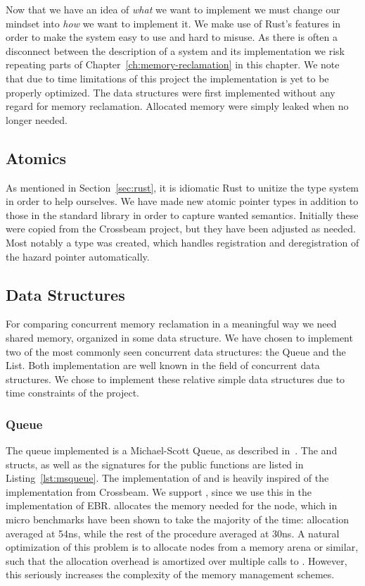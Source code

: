 \documentclass[b5paper]{report}
\begin{document}
Now that we have an idea of \emph{what} we want to implement we must change our
mindset into \emph{how} we want to implement it. We make use of Rust's features
in order to make the system easy to use and hard to misuse.  As there is often a
disconnect between the description of a system and its implementation we risk
repeating parts of Chapter~\ref{ch:memory-reclamation} in this chapter. We note
that due to time limitations of this project the implementation is yet to be
properly optimized. The data structures were first implemented without any
regard for memory reclamation.  Allocated memory were simply leaked when no
longer needed.


\subsection{Atomics\label{sec:atomics}}

As mentioned in Section~\ref{sec:rust}, it is idiomatic Rust to unitize the type
system in order to help ourselves. We have made new atomic pointer types in addition
to those in the standard library in order to capture wanted semantics. Initially
these were copied from the Crossbeam project\cite{crossbeam-msqueue}, but they have been adjusted as
needed. Most notably a  type was created, which handles
registration and deregistration of the hazard pointer automatically.


\subsection{Data Structures\label{sec:data-structures}}

For comparing concurrent memory reclamation in a meaningful way we need shared
memory, organized in some data structure. We have chosen to implement two of the
most commonly seen concurrent data structures: the Queue and the List. Both
implementation are well known in the field of concurrent data structures. We
chose to implement these relative simple data structures due to time constraints
of the project.


\subsubsection{Queue}

The queue implemented is a Michael-Scott Queue, as described
in~\cite{michael1996simple}. The  and  structs, as well
as the signatures for the public functions are listed in
Listing~\ref{lst:msqueue}. The implementation of  and  is
heavily inspired of the implementation from Crossbeam.  We support
, since we use this in the implementation of EBR.  
allocates the memory needed for the node, which in micro benchmarks have been
shown to take the majority of the time: allocation averaged at 54ns, while the
rest of the procedure averaged at 30ns.  A natural optimization of this problem
is to allocate nodes from a memory arena or similar, such that the allocation
overhead is amortized over multiple calls to . However, this
seriously increases the complexity of the memory management schemes.
\end{document}
